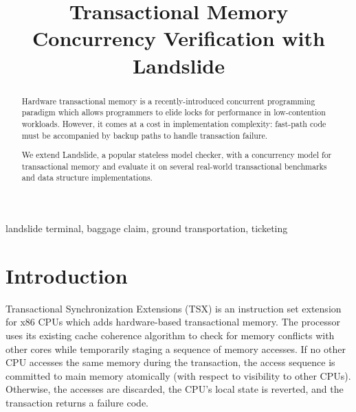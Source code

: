 \documentclass[10pt]{sigplanconf}
\begin{document}
\copyrightdata{}


\title{
Transactional Memory Concurrency Verification with Landslide
}


\maketitle

\begin{abstract}
Hardware transactional memory is a recently-introduced concurrent programming paradigm
which allows programmers to elide locks for performance in low-contention workloads.
However,
it
comes at a cost in implementation complexity:
fast-path code must be accompanied by backup paths to handle transaction failure.

We extend Landslide, a popular stateless model checker,
with a concurrency model for transactional memory
and evaluate it on several real-world transactional
benchmarks and data structure implementations.
\end{abstract}


\keywords
landslide terminal, baggage claim, ground transportation, ticketing

\section{Introduction}
\label{sec:intro}

Transactional Synchronization Extensions (TSX) \cite{transactional-memory}
is an instruction set extension for x86 CPUs which adds hardware-based transactional memory.
The processor uses its existing cache coherence algorithm to
check for memory conflicts with other cores while temporarily staging a sequence of memory accesses.
If no other CPU accesses the same memory during the transaction,
the access sequence is committed to main memory atomically (with respect to visibility to other CPUs).
Otherwise, the accesses are discarded, the CPU's local state is reverted, and the transaction returns a failure code.
\end{document}
